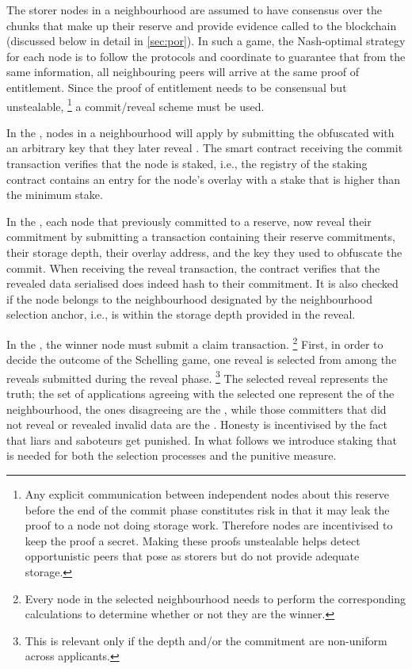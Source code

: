 The storer nodes in a neighbourhood are assumed to have  consensus over the chunks that make up their reserve and provide evidence called  to the blockchain (discussed below in detail in \ref{sec:por}). In such a game, the Nash-optimal strategy for each node is to follow the protocols and coordinate to guarantee that from the same information, all neighbouring peers will arrive at the same proof of entitlement. Since the proof of entitlement needs to be consensual but unstealable,%
%
\footnote{%
Any explicit communication between independent nodes about this reserve before the end of the commit phase constitutes risk in that it may leak the proof to a node not doing storage work. Therefore nodes are incentivised to keep the proof a secret. Making these proofs unstealable helps detect opportunistic peers that pose as storers but do not provide adequate storage.}
%
a commit/reveal scheme must be used.

In the , nodes in a neighbourhood will apply by submitting the  obfuscated with an arbitrary key that they later reveal%
. The smart contract receiving the commit transaction verifies that the node is staked, i.e., the registry of the staking contract contains an entry for the node's overlay with a stake that is higher than the minimum stake.

In the , each node that previously committed to a reserve, now reveal their commitment by submitting a transaction containing
their reserve commitments, their storage depth,
their overlay address, and the key they used to obfuscate  the commit.
When receiving the reveal transaction, the contract  verifies that the revealed data serialised does indeed hash to their commitment. It is also checked if the node belongs to the neighbourhood designated by the neighbourhood selection anchor, i.e., is within the storage depth provided in the reveal.

In the , the winner node must submit a claim transaction.%
%
\footnote{Every node in the selected neighbourhood needs to perform the corresponding calculations to determine whether or not they are the winner.}
%
First, in order to decide the outcome of the Schelling game, one reveal is selected  from among the reveals submitted during the reveal phase.%
%
\footnote{This is relevant only if the depth and/or the commitment are non-uniform across applicants.}
%
The selected reveal represents the truth; the set of applications agreeing with the selected one represent the  of the neighbourhood, the ones disagreeing are the , while those committers that did not reveal or revealed invalid data are the . Honesty is incentivised by the fact that liars and saboteurs get punished. In what follows we introduce staking that is needed for both the selection processes and the punitive measure.


